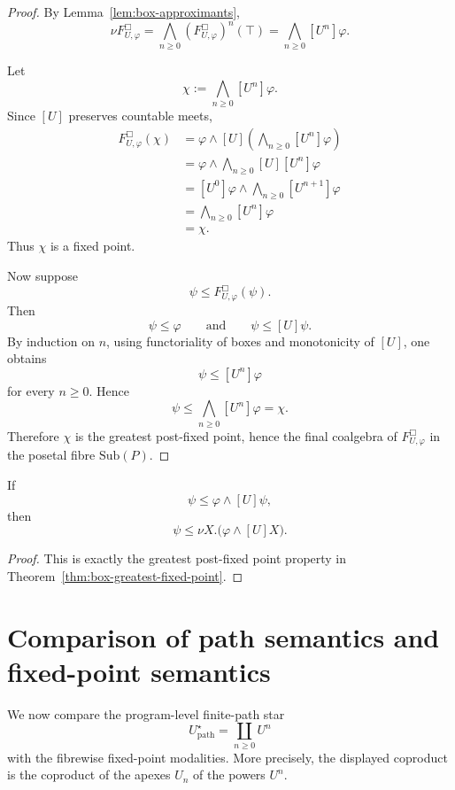 \begin{proof}
By Lemma~\ref{lem:box-approximants},
\[
\nu F^\Box_{U,\varphi}
=
\bigwedge_{n\ge0}(F^\Box_{U,\varphi})^n(\top)
=
\bigwedge_{n\ge0}[U^n]\varphi.
\]

Let
\[
\chi:=
\bigwedge_{n\ge0}[U^n]\varphi.
\]
Since \([U]\) preserves countable meets,
\[
\begin{aligned}
F^\Box_{U,\varphi}(\chi)
&=
\varphi\wedge[U]
\left(
\bigwedge_{n\ge0}[U^n]\varphi
\right)
\\
&=
\varphi
\wedge
\bigwedge_{n\ge0}
[U][U^n]\varphi
\\
&=
[U^0]\varphi
\wedge
\bigwedge_{n\ge0}
[U^{n+1}]\varphi
\\
&=
\bigwedge_{n\ge0}[U^n]\varphi
\\
&=
\chi.
\end{aligned}
\]
Thus \(\chi\) is a fixed point.

Now suppose
\[
\psi\le F^\Box_{U,\varphi}(\psi).
\]
Then
\[
\psi\le\varphi
\qquad
\text{and}
\qquad
\psi\le[U]\psi.
\]
By induction on \(n\), using functoriality of boxes and monotonicity of \([U]\), one obtains
\[
\psi\le [U^n]\varphi
\]
for every \(n\ge0\). Hence
\[
\psi
\le
\bigwedge_{n\ge0}[U^n]\varphi
=
\chi.
\]
Therefore \(\chi\) is the greatest post-fixed point, hence the final coalgebra of \(F^\Box_{U,\varphi}\) in the posetal fibre \(\mathrm{Sub}(P)\).
\end{proof}

\begin{corollary}
\label{cor:box-coinduction-principle}
If
\[
\psi\le\varphi\wedge[U]\psi,
\]
then
\[
\psi\le
\nu X.\bigl(\varphi\wedge[U]X\bigr).
\]
\end{corollary}

\begin{proof}
This is exactly the greatest post-fixed point property in Theorem~\ref{thm:box-greatest-fixed-point}.
\end{proof}

\section{Comparison of path semantics and fixed-point semantics}
\label{sec:path-fixed-point-comparison}

We now compare the program-level finite-path star
\[
U^\star_{\mathrm{path}}
=
\coprod_{n\ge0}U^n
\]
with the fibrewise fixed-point modalities. More precisely, the displayed coproduct is the coproduct of the apexes \(U_n\) of the powers \(U^n\).

